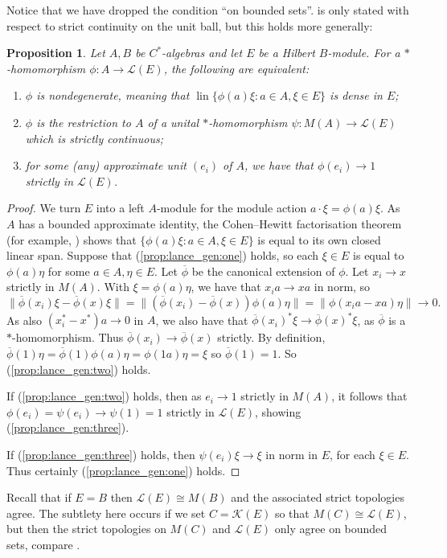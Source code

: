 \documentclass[a4paper,12pt]{article}
\theoremstyle{plain}
\newtheorem{proposition}{Proposition}[section]
\theoremstyle{definition}
\newcommand{\mc}[1]{\mathcal{#1}}
\newcommand{\lin}{\operatorname{lin}}
\begin{document}
\medskip
{\small
Notice that we have dropped the condition ``on bounded sets''.  \cite[Proposition~2.5]{lance} is only
stated with respect to strict continuity on the unit ball, but this holds more generally:

\begin{proposition}\label{prop:lance_gen}
Let $A,B$ be $C^*$-algebras and let $E$ be a Hilbert $B$-module.  For a $*$-homomorphism $\phi:A
\rightarrow\mc L(E)$, the following are equivalent:
\begin{enumerate}
\item\label{prop:lance_gen:one}
  $\phi$ is nondegenerate, meaning that $\lin\{ \phi(a)\xi : a\in A, \xi\in E \}$ is dense in $E$;
\item\label{prop:lance_gen:two}
  $\phi$ is the restriction to $A$ of a unital $*$-homomorphism $\psi:M(A)\rightarrow\mc L(E)$ which is
  strictly continuous;
\item\label{prop:lance_gen:three}
  for some (any) approximate unit $(e_i)$ of $A$, we have that $\phi(e_i)\rightarrow 1$ strictly in
  $\mc L(E)$.
\end{enumerate}
\end{proposition}
\begin{proof}
We turn $E$ into a left $A$-module for the module action
$a\cdot\xi = \phi(a)\xi$.  As $A$ has a bounded approximate identity, the Cohen--Hewitt factorisation
theorem (for example, \cite[Appendix~A]{mnw}) shows that $\{ \phi(a)\xi : a\in A, \xi\in E \}$ is
equal to its own closed linear span.  Suppose that (\ref{prop:lance_gen:one}) holds, so each $\xi\in E$
is equal to $\phi(a)\eta$ for some $a\in A, \eta\in E$.  Let $\overline\phi$ be the canonical extension
of $\phi$.  Let $x_i\rightarrow x$ strictly in $M(A)$.  With $\xi=\phi(a)\eta$, we have that
$x_i a \rightarrow xa$ in norm, so
\[ \| \overline\phi(x_i)\xi - \overline\phi(x)\xi\| = \| (\overline\phi(x_i)-\overline\phi(x))\phi(a)\eta\|
= \| \phi(x_ia - xa)\eta\| \rightarrow 0. \]
As also $(x_i^*-x^*)a\rightarrow 0$ in $A$, we also have that $\overline\phi(x_i)^*\xi
\rightarrow \overline\phi(x)^*\xi$, as $\overline\phi$ is a $*$-homomorphism.
Thus $\overline\phi(x_i) \rightarrow \overline\phi(x)$ strictly.  By definition, $\overline\phi(1) \eta
= \overline\phi(1) \phi(a)\eta = \phi(1a)\eta = \xi$ so $\overline\phi(1) = 1$.  So (\ref{prop:lance_gen:two})
holds.

If (\ref{prop:lance_gen:two}) holds, then as $e_i\rightarrow 1$ strictly in $M(A)$, it follows that $\phi(e_i)
= \psi(e_i)\rightarrow \psi(1)=1$ strictly in $\mc L(E)$, showing (\ref{prop:lance_gen:three}).

If (\ref{prop:lance_gen:three}) holds, then $\psi(e_i)\xi \rightarrow \xi$ in norm in $E$, for each $\xi\in E$.
Thus certainly (\ref{prop:lance_gen:one}) holds.
\end{proof}

Recall that if $E=B$ then $\mc L(E) \cong M(B)$ and the associated strict topologies agree.  The subtlety
here occurs if we set $C=\mc K(E)$ so that $M(C) \cong \mc L(E)$, but then the strict topologies on $M(C)$
and $\mc L(E)$ only agree on bounded sets, compare \cite[Chapter~8]{lance}.
}
\medskip
\end{document}
